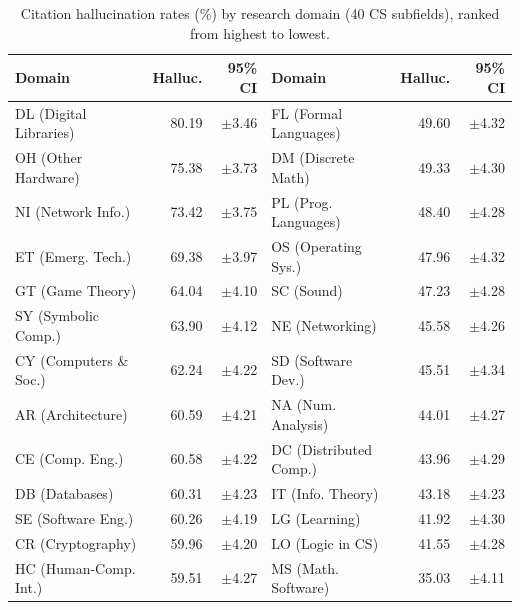 \begin{table}[t]
\centering
\caption{Citation hallucination rates (\%) by research domain (40 CS subfields), ranked from highest to lowest.}
\label{tab:domain_sensitivity}
\small
{}
\begin{tabular}{lrr@{\hskip 2em}lrr}
\toprule
\textbf{Domain} & \cellcolor{red!12}\textbf{Halluc.} & \textbf{95\% CI} & \textbf{Domain} & \cellcolor{red!12}\textbf{Halluc.} & \textbf{95\% CI} \\
\midrule
DL (Digital Libraries) & \cellcolor{red!28}80.19 & $\pm$3.46 & FL (Formal Languages) & \cellcolor{red!20}49.60 & $\pm$4.32 \\
OH (Other Hardware) & \cellcolor{red!28}75.38 & $\pm$3.73 & DM (Discrete Math) & \cellcolor{red!20}49.33 & $\pm$4.30 \\
NI (Network Info.) & \cellcolor{red!28}73.42 & $\pm$3.75 & PL (Prog. Languages) & \cellcolor{red!20}48.40 & $\pm$4.28 \\
ET (Emerg. Tech.) & \cellcolor{red!28}69.38 & $\pm$3.97 & OS (Operating Sys.) & \cellcolor{red!20}47.96 & $\pm$4.32 \\
GT (Game Theory) & \cellcolor{red!26}64.04 & $\pm$4.10 & SC (Sound) & \cellcolor{red!18}47.23 & $\pm$4.28 \\
SY (Symbolic Comp.) & \cellcolor{red!26}63.90 & $\pm$4.12 & NE (Networking) & \cellcolor{red!18}45.58 & $\pm$4.26 \\
CY (Computers \& Soc.) & \cellcolor{red!26}62.24 & $\pm$4.22 & SD (Software Dev.) & \cellcolor{red!18}45.51 & $\pm$4.34 \\
AR (Architecture) & \cellcolor{red!24}60.59 & $\pm$4.21 & NA (Num. Analysis) & \cellcolor{red!18}44.01 & $\pm$4.27 \\
CE (Comp. Eng.) & \cellcolor{red!24}60.58 & $\pm$4.22 & DC (Distributed Comp.) & \cellcolor{red!18}43.96 & $\pm$4.29 \\
DB (Databases) & \cellcolor{red!24}60.31 & $\pm$4.23 & IT (Info. Theory) & \cellcolor{red!18}43.18 & $\pm$4.23 \\
SE (Software Eng.) & \cellcolor{red!24}60.26 & $\pm$4.19 & LG (Learning) & \cellcolor{red!16}41.92 & $\pm$4.30 \\
CR (Cryptography) & \cellcolor{red!24}59.96 & $\pm$4.20 & LO (Logic in CS) & \cellcolor{red!16}41.55 & $\pm$4.28 \\
HC (Human-Comp. Int.) & \cellcolor{red!24}59.51 & $\pm$4.27 & MS (Math. Software) & \cellcolor{red!14}35.03 & $\pm$4.11 \\

\end{tabular}
\end{table}
